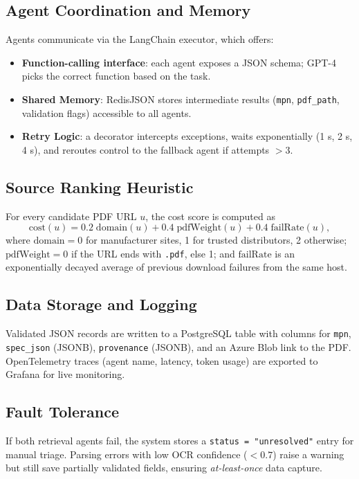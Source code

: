\subsection{Agent Coordination and Memory}
Agents communicate via the LangChain executor, which offers:  
\begin{itemize}
  \item \textbf{Function-calling interface}: each agent exposes a JSON schema; GPT-4 picks the correct function based on the task.  
  \item \textbf{Shared Memory}: RedisJSON stores intermediate results (\verb|mpn|, \verb|pdf_path|, validation flags) accessible to all agents.  
  \item \textbf{Retry Logic}: a decorator intercepts exceptions, waits exponentially (1 s, 2 s, 4 s), and reroutes control to the fallback agent if attempts $>3$.
\end{itemize}

\subsection{Source Ranking Heuristic}
For every candidate PDF URL $u$, the cost score is computed as
\begin{equation}
\label{eq:heuristic}
\mathrm{cost}(u)=0.2\;\mathrm{domain}(u)+0.4\;\mathrm{pdfWeight}(u)+0.4\;\mathrm{failRate}(u),
\end{equation}
where \(\mathrm{domain}=0\) for manufacturer sites, 1 for trusted distributors, 2 otherwise;  
\(\mathrm{pdfWeight}=0\) if the URL ends with \texttt{.pdf}, else 1;  
and \(\mathrm{failRate}\) is an exponentially decayed average of previous download failures from the same host.

\subsection{Data Storage and Logging}
Validated JSON records are written to a PostgreSQL table with columns for \verb|mpn|, \verb|spec_json| (JSONB), \verb|provenance| (JSONB), and an Azure Blob link to the PDF.  
OpenTelemetry traces (agent name, latency, token usage) are exported to Grafana for live monitoring.

\subsection{Fault Tolerance}
If both retrieval agents fail, the system stores a \verb|status = "unresolved"| entry for manual triage.  
Parsing errors with low OCR confidence ($<0.7$) raise a warning but still save partially validated fields, ensuring \emph{at-least-once} data capture.

